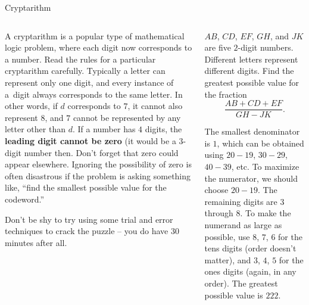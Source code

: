 \documentclass[9pt,aspectratio=169]{beamer}
\begin{document}
\begin{frame}{Cryptarithm}
  \begin{columns}[T]
    \begin{column}{0.5\textwidth}
      A cryptarithm is a popular type of mathematical logic problem, where each digit now corresponds to a number.  Read the rules for a particular cryptarithm carefully.  Typically a letter can represent only one digit, and every instance of a~digit always corresponds to the same letter.  In other words, if $d$ corresponds to $7$, it cannot also represent $8$, and $7$ cannot be represented by any letter other than $d$.  If a number has $4$ digits, the \textbf{leading digit cannot be zero} (it would be a $3$-digit number then.  Don’t forget that zero could appear elsewhere.  Ignoring the possibility of zero is often disastrous if the problem is asking something like, “find the smallest possible value for the codeword.”

      Don’t be shy to try using some trial and error techniques to crack the puzzle -- you do have $30$ minutes after all. 

    \end{column}
    \begin{column}{0.5\textwidth}
      \begin{problem}
        $AB$, $CD$, $EF$, $GH$, and $JK$ are five $2$-digit numbers.  Different letters represent different digits.  Find the greatest possible value for the fraction
        \[ \frac{AB + CD + EF}{GH - JK}. \]
        \vspace*{-0.5em}
      \end{problem}

      The smallest denominator is $1$, which can be obtained using $20-19$, $30-29$, $40-39$, etc.  To maximize the numerator, we should choose $20-19$.  The remaining digits are $3$ through $8$.  To make the numerand as large as possible, use $8$, $7$, $6$ for the tens digits (order doesn’t matter), and $3$, $4$, $5$ for the ones digits (again, in any order).  The greatest possible value is $222$.
    \end{column}
  \end{columns}
\end{frame}
\end{document}
